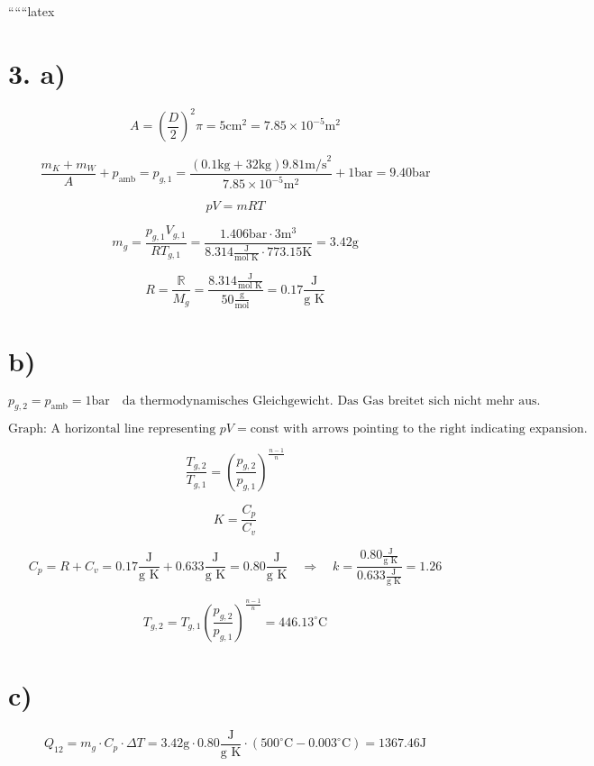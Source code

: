 
``````latex


\section*{3. a)}

\[
A = \left( \frac{D}{2} \right)^2 \pi = 5 \text{cm}^2 = 7.85 \times 10^{-5} \text{m}^2
\]

\[
\frac{m_K + m_W}{A} + p_{\text{amb}} = p_{g,1} = \frac{(0.1 \text{kg} + 32 \text{kg}) 9.81 \text{m/s}^2}{7.85 \times 10^{-5} \text{m}^2} + 1 \text{bar} = 9.40 \text{bar}
\]

\[
pV = mRT
\]

\[
m_g = \frac{p_{g,1} V_{g,1}}{R T_{g,1}} = \frac{1.406 \text{bar} \cdot 3 \text{m}^3}{8.314 \frac{\text{J}}{\text{mol K}} \cdot 773.15 \text{K}} = 3.42 \text{g}
\]

\[
R = \frac{\mathbb{R}}{M_g} = \frac{8.314 \frac{\text{J}}{\text{mol K}}}{50 \frac{\text{g}}{\text{mol}}} = 0.17 \frac{\text{J}}{\text{g K}}
\]

\section*{b)}

\[
p_{g,2} = p_{\text{amb}} = 1 \text{bar} \quad \text{da thermodynamisches Gleichgewicht. Das Gas breitet sich nicht mehr aus.}
\]

\[
\text{Graph: A horizontal line representing } pV = \text{const} \text{ with arrows pointing to the right indicating expansion.}
\]

\[
\frac{T_{g,2}}{T_{g,1}} = \left( \frac{p_{g,2}}{p_{g,1}} \right)^{\frac{n-1}{n}}
\]

\[
K = \frac{C_p}{C_v}
\]

\[
C_p = R + C_v = 0.17 \frac{\text{J}}{\text{g K}} + 0.633 \frac{\text{J}}{\text{g K}} = 0.80 \frac{\text{J}}{\text{g K}} \quad \Rightarrow \quad k = \frac{0.80 \frac{\text{J}}{\text{g K}}}{0.633 \frac{\text{J}}{\text{g K}}} = 1.26
\]

\[
T_{g,2} = T_{g,1} \left( \frac{p_{g,2}}{p_{g,1}} \right)^{\frac{n-1}{n}} = 446.13^\circ \text{C}
\]

\section*{c)}

\[
Q_{12} = m_g \cdot C_p \cdot \Delta T = 3.42 \text{g} \cdot 0.80 \frac{\text{J}}{\text{g K}} \cdot (500^\circ \text{C} - 0.003^\circ \text{C}) = 1367.46 \text{J}
\]

